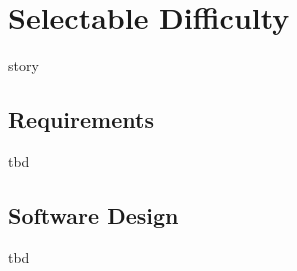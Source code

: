 \documentclass{article}
\begin{document}
\section{Selectable Difficulty}
story

\subsection{Requirements}
tbd

\subsection{Software Design}
tbd
\end{document}
